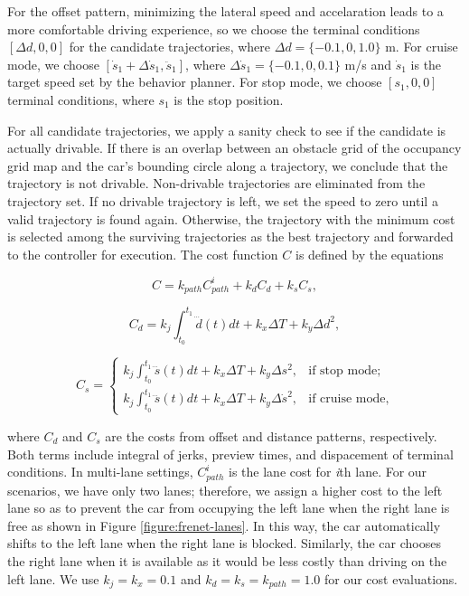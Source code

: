 For the offset pattern, minimizing the lateral speed and accelaration leads to
a more comfortable driving experience, so  we choose the terminal conditions
$[\Delta d, 0, 0]$ for the candidate trajectories, where $\Delta d = \{-0.1, 0,
1.0\}$ m. For cruise mode, we choose $[\dot{s}_1 + \Delta \dot{s}_1,
\ddot{s}_1]$, where $\Delta \dot{s}_1 = \{-0.1, 0, 0.1\}$ m/s and $\dot{s}_1$
is the target speed set by the behavior planner. For stop mode, we choose
$[s_1, 0, 0]$ terminal conditions, where $s_1$ is the stop position.

For all candidate trajectories, we apply a sanity check to see if the candidate
is actually drivable. If there is an overlap between an obstacle grid of the
occupancy grid map and the car's bounding circle along a trajectory, we
conclude that the trajectory is not drivable. Non-drivable trajectories are
eliminated from the trajectory set. If no drivable trajectory is left, we set
the speed to zero until a valid trajectory is found again. Otherwise, the
trajectory with the minimum cost is selected among the surviving trajectories
as the best trajectory and forwarded to the controller for execution. The cost
function $C$ is defined by the equations

\begin{equation}
  C = k_{path}C^i_{path} + k_dC_d + k_sC_s,
\label{eq:cost1}
\end{equation}

\begin{equation}
  C_d = k_j\int_{t_0}^{t_1}\dddot{d}(t)dt + k_x\Delta T + k_y\Delta d^2,
\label{eq:cost2}
\end{equation}

\begin{equation}
  C_s =
  \begin{cases}
    k_j\int_{t_0}^{t_1}\dddot{s}(t)dt + k_x\Delta T + k_y\Delta s^2,
    &\text{if stop mode;} \\
    k_j\int_{t_0}^{t_1}\dddot{s}(t)dt + k_x\Delta T + k_y\Delta \dot{s}^2,
    &\text{if cruise mode,}
  \end{cases}
  \label{eq:cost3}
\end{equation}

where $C_d$ and $C_s$ are the costs from offset and distance patterns,
respectively. Both terms include integral of jerks, preview times, and
dispacement of terminal conditions. In multi-lane settings, $C^i_{path}$ is the
lane cost for \textit{i}th lane. For our scenarios, we have only two lanes;
therefore, we assign a higher cost to the left lane so as to prevent the car
from occupying the left lane when the right lane is free as shown in Figure
\ref{figure:frenet-lanes}. In this way, the car automatically shifts to the
left lane when the right lane is blocked. Similarly, the car chooses the right
lane when it is available as it would be less costly than driving on the left
lane. We use $k_j = k_x = 0.1$ and $k_d = k_s = k_{path} = 1.0$ for our cost
evaluations.

